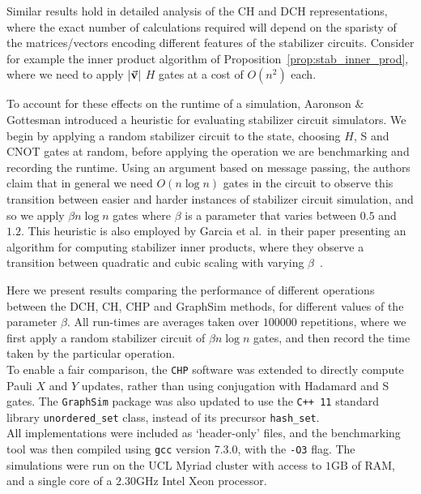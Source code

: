 Similar results hold in detailed analysis of the CH and DCH representations, where the exact number of calculations required will depend on the sparisty of the matrices/vectors encoding different features of the stabilizer circuits. Consider for example the inner product algorithm of Proposition~\ref{prop:stab_inner_prod}, where we need to apply $\vert \va{v}\vert$ $H$ gates at a cost of $O(n^{2})$ each.\par
To account for these effects on the runtime of a simulation, Aaronson \& Gottesman introduced a heuristic for evaluating stabilizer circuit simulators. We begin by applying a random stabilizer circuit to the state, choosing $H$, S and CNOT gates at random, before applying the operation we are benchmarking and recording the runtime. Using an argument based on message passing, the authors claim that in general we need $O(n\log{n})$ gates in the circuit to observe this transition between easier and harder instances of stabilizer circuit simulation, and so we apply $\beta n\log{n}$ gates where $\beta$ is a parameter that varies between $0.5$ and $1.2$. This heuristic is also employed by Garcia et al.\ in their paper presenting an algorithm for computing stabilizer inner products, where they observe a transition between quadratic and cubic scaling with varying $\beta$~\cite{Garcia2012}.\par
Here we present results comparing the performance of different operations between the DCH, CH, CHP and GraphSim methods, for different values of the parameter $\beta$. All run-times are averages taken over $100000$ repetitions, where we first apply a random stabilizer circuit of $\beta n\log{n}$ gates, and then record the time taken by the particular operation.\\
To enable a fair comparison, the \texttt{CHP} software was extended to directly compute Pauli $X$ and $Y$ updates, rather than using conjugation with Hadamard and S gates. The \texttt{GraphSim} package was also updated to use the \texttt{C++ 11} standard library \texttt{unordered\_set} class, instead of its precursor \texttt{hash\_set}.\\
All implementations were included as `header-only' files, and the benchmarking tool was then compiled using \texttt{gcc} version 7.3.0, with the \texttt{-O3} flag. The simulations were run on the UCL Myriad cluster with access to $1\mathrm{GB}$ of RAM, and a single core of a $2.30\mathrm{GHz}$ Intel Xeon processor.
